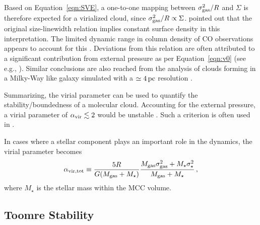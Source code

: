 \IfFileExists{emulateapjlegacy.cls}{\documentclass[iop]{emulateapjlegacy}}{\documentclass[iop]{emulateapj}}
\begin{document}
Based on Equation~\ref{eqn:SVE}, a one-to-one mapping between $\sigma_{\rm gas}^2/R$ and $\Sigma$ is therefore expected for a virialized cloud, since $\sigma_{\rm gas}^2/R\propto\Sigma$.
%
\citep{Heyer09a} pointed out that the original size-linewidth relation implies constant surface density in this interpretation. The limited dynamic range in column density of CO observations appears to account for this \citep[see also][]{Ballesteros-Paredes11a}.
%
Deviations from this relation are often attributed to a significant contribution from external pressure as per Equation~\ref{eqn:v0} (see e.g., \citealt{Heyer09a, Hughes10a, Hughes13b, Meidt13a}). Similar conclusions are also reached from the
analysis of clouds forming in a Milky-Way like galaxy simulated with a $\simeq 4\,{\rm pc}$ resolution \citep[i.e.][]{grisdale:2018}.

Summarizing, the virial parameter can be used to quantify the stability/boundedness of a molecular cloud. Accounting for the external pressure, a virial parameter of $\alpha_{\rm vir}\lesssim2$ would be unstable \citep{Bertoldi92b}. Such a criterion is often used in \obs \citep[see e.g., ][]{Kauffmann17b}.

In cases where a stellar component plays an important role in the dynamics, the virial parameter becomes
\begin{equation}
\alpha_{\rm vir, tot} \equiv \frac{5 R}{G (M_{\rm gas} + M_{\star})} \frac{M_{\rm gas} \sigma_{\rm gas}^2 + M_{\star} \sigma_\star^2}
					       {M_{\rm gas} + M_{\star} }\,,
\label{eqn:alpha_tot}
\end{equation}
where $M_\star$ is the stellar mass within the MCC volume.

\subsection{Toomre Stability}\label{sec:Q}
\end{document}
